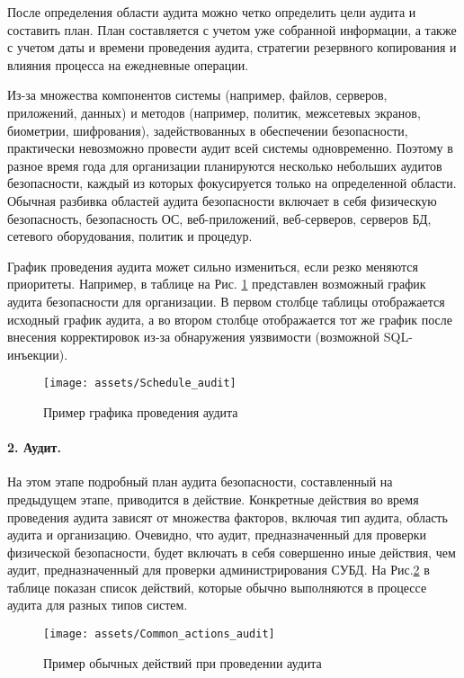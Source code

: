 После определения области аудита можно четко определить цели аудита и составить план. План составляется с учетом уже собранной информации, а также с учетом даты и времени проведения аудита, стратегии резервного копирования и влияния процесса на ежедневные операции.

Из-за множества компонентов системы (например, файлов, серверов, приложений, данных) и методов (например, политик, межсетевых экранов, биометрии, шифрования), задействованных в обеспечении безопасности, практически невозможно провести аудит всей системы одновременно. Поэтому в разное время года для организации планируются несколько небольших аудитов безопасности, каждый из которых фокусируется только на определенной области. Обычная разбивка областей аудита безопасности включает в себя физическую безопасность, безопасность ОС, веб-приложений, веб-серверов, серверов БД, сетевого оборудования, политик и процедур.

График проведения аудита может сильно измениться, если резко меняются приоритеты. Например, в таблице на Рис. \ref{fig:Schedule_audit} представлен возможный график аудита безопасности для организации. В первом столбце таблицы отображается исходный график аудита, а во втором столбце отображается тот же график после внесения корректировок из-за обнаружения уязвимости (возможной SQL-инъекции).

\begin{figure}[h!]
    \centering
    \texttt{[image: assets/Schedule\_audit]}
    \caption{Пример графика проведения аудита}
	\label{fig:Schedule_audit}
\end{figure}

\paragraph{2. Аудит.}

На этом этапе подробный план аудита безопасности, составленный на предыдущем этапе, приводится в действие. Конкретные действия во время проведения аудита зависят от множества факторов, включая тип аудита, область аудита и организацию. Очевидно, что аудит, предназначенный для проверки физической безопасности, будет включать в себя совершенно иные действия, чем аудит, предназначенный для проверки администрирования СУБД. На Рис.\ref{fig:Common_actions_audit} в таблице показан список действий, которые обычно выполняются в процессе аудита для разных типов систем.

\begin{figure}[h!]
    \centering
    \texttt{[image: assets/Common\_actions\_audit]}
    \caption{Пример обычных действий при проведении аудита}
	\label{fig:Common_actions_audit}
\end{figure}

